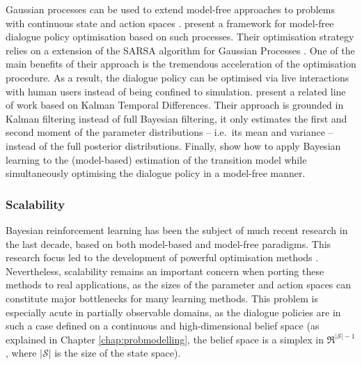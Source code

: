 Gaussian processes can be used to extend model-free approaches to problems with continuous state and action spaces \citep{Engel:2005}. \cite{milica2013} present a framework for model-free dialogue policy optimisation based on such processes. Their optimisation strategy relies on a extension of the SARSA algorithm for Gaussian Processes \citep{Engel:2005}. One of the main benefits of their approach is the tremendous acceleration of the optimisation procedure.  As a result, the dialogue policy can be optimised via live interactions with human users instead of being confined to simulation. \cite{Supelec808} present a related line of work based on Kalman Temporal Differences.  Their approach is grounded in Kalman filtering instead of full Bayesian filtering, it only estimates the first and second moment of the parameter distributions -- i.e.\ its mean and variance -- instead of the full posterior distributions.  Finally, \cite{DBLP:conf/slt/ThomsonJGKMYY10} show how to apply Bayesian learning to the (model-based) estimation of the transition model while simultaneously optimising the dialogue policy in a model-free manner. 






\subsubsection*{Scalability}

Bayesian reinforcement learning has been the subject of much recent research in the last decade, based on both model-based and model-free paradigms. This research focus led to the development of powerful optimisation methods \cite[see e.g.][for a detailed survey]{brl2012}. Nevertheless, scalability remains an important concern when porting these methods to real applications, as the sizes of the parameter and action spaces can  constitute major bottlenecks for many learning methods.  This problem is especially acute in partially observable domains, as the dialogue policies are in such a case defined on a continuous and high-dimensional belief space (as explained in Chapter \ref{chap:probmodelling}, the belief space is a simplex in $\Re^{|\mathcal{S}|-1}$, where $|\mathcal{S}|$ is the size of the state space).  

